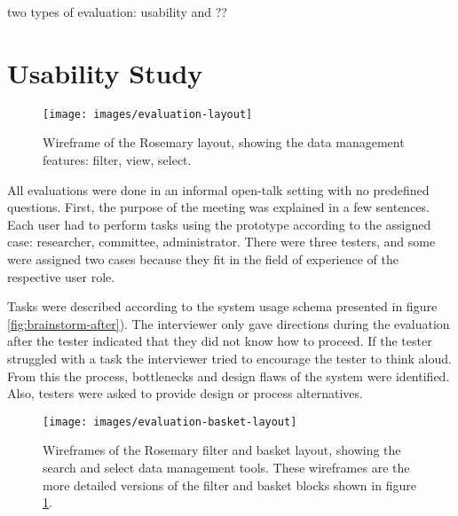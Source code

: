 two types of evaluation: usability and ??


\section{Usability Study}


\begin{figure}[!b]
	\centering
	\texttt{[image: images/evaluation-layout]}
	\caption{
		Wireframe of the Rosemary layout, showing the data management features: filter, view, select. 
	}
	\label{fig:evaluation-layout}
\end{figure}

All evaluations were done in an informal open-talk setting with no predefined questions.
First, the purpose of the meeting was explained in a few sentences.
Each user had to perform tasks using the prototype according to the assigned case: researcher, committee, administrator.
There were three testers, and some were assigned two cases because they fit in the field of experience of the respective user role.

Tasks were described according to the system usage schema presented in figure \ref{fig:brainstorm-after}).
The interviewer only gave directions during the evaluation after the tester indicated that they did not know how to proceed.
If the tester struggled with a task the interviewer tried to encourage the tester to think aloud.
From this the process, bottlenecks and design flaws of the system were identified.
Also, testers were asked to provide design or process alternatives. 


\begin{figure}[th]
	\centering
	\texttt{[image: images/evaluation-basket-layout]}
	\caption{
		Wireframes of the Rosemary filter and basket layout, showing the search and select data management tools.
		These wireframes are the more detailed versions of the filter and basket blocks shown in figure \ref{fig:evaluation-layout}.
	}
	\label{fig:evaluation-basket-layout}
\end{figure}

